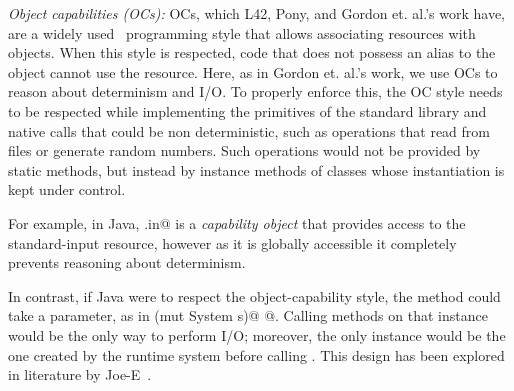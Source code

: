 
\textit{Object capabilities (OCs):}
OCs, which L42, Pony, and Gordon et. al.'s work have, are a widely used~\cite{???} programming style that allows associating resources with objects. When this style
is respected, code that does not possess an alias to the object cannot use the resource.
Here, as in Gordon et. al.'s work, we use OCs to reason about determinism and I/O. To properly enforce this, the OC style needs to be respected while implementing the primitives of the standard library and native calls that could be non deterministic, such as operations that read from files or generate random numbers. Such operations would not be provided by static methods, but instead by instance methods of classes whose instantiation is kept under control. 




\lstset{language=Java}
 For example, in Java, \Q@System.in@
 \lstset{language=FortyTwo} 
  is a \emph{capability object} that provides access to the standard-input resource, however as it is globally accessible it completely prevents reasoning about determinism. 

In contrast, if Java were to respect the object-capability style, the \Q@main@ method could take a \Q@System@ parameter, as in
 \Q@main(mut System s)@
 \lstset{language=Java}
@.
Calling methods on that \Q@System@ instance would be the only way to perform I/O;
moreover, the only \Q@System@ instance would be the one created by the runtime system before calling \Q@main@. %
This design has been explored in literature by Joe-E~\cite{finifter2008verifiable}.
\lstset{language=FortyTwo}

